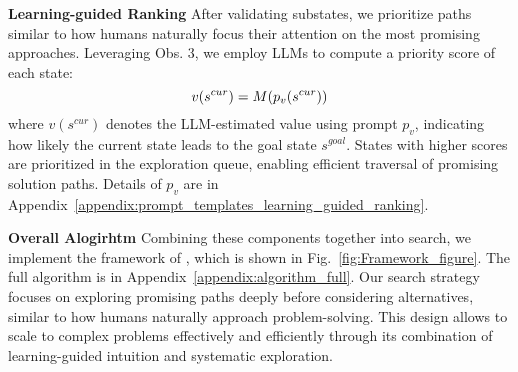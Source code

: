 \noindent \textbf{Learning-guided Ranking}
After validating substates, we prioritize paths similar to how humans naturally focus their attention on the most promising approaches. Leveraging Obs. 3, we employ LLMs to compute a priority score of each state:
\begin{equation}
\small
v(s^{cur}) = M(p_v(s^{cur}))
\end{equation}
where $v(s^{cur})$ denotes the LLM-estimated value using prompt $p_v$, indicating how likely the current state leads to the goal state $s^{goal}$. States with higher scores are prioritized in the exploration queue, enabling efficient traversal of promising solution paths. Details of $p_{v}$ are in Appendix~\ref{appendix:prompt_templates_learning_guided_ranking}.


\noindent \textbf{Overall Alogirhtm}
Combining these components together into search, we implement the framework of \method, which is shown in Fig.~\ref{fig:Framework_figure}. The full algorithm is in Appendix~\ref{appendix:algorithm_full}. Our search strategy focuses on exploring promising paths deeply before considering alternatives, similar to how humans naturally approach problem-solving. This design allows \method to scale to complex problems effectively and efficiently through its combination of learning-guided intuition and systematic exploration.

